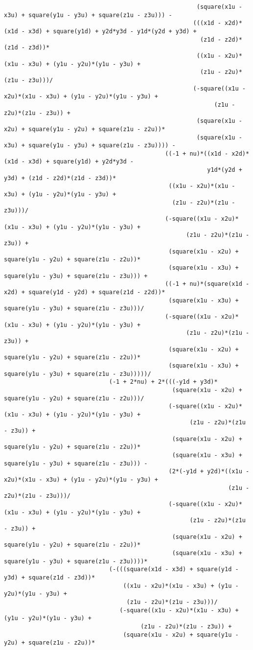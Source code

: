\begin{lstlisting}
													   (square(x1u - x3u) + square(y1u - y3u) + square(z1u - z3u))) - 
													  (((x1d - x2d)*(x1d - x3d) + square(y1d) + y2d*y3d - y1d*(y2d + y3d) + 
														(z1d - z2d)*(z1d - z3d))*
													   ((x1u - x2u)*(x1u - x3u) + (y1u - y2u)*(y1u - y3u) + 
														(z1u - z2u)*(z1u - z3u)))/
													  (-square((x1u - x2u)*(x1u - x3u) + (y1u - y2u)*(y1u - y3u) + 
															(z1u - z2u)*(z1u - z3u)) + 
													   (square(x1u - x2u) + square(y1u - y2u) + square(z1u - z2u))*
													   (square(x1u - x3u) + square(y1u - y3u) + square(z1u - z3u)))) - 
											  ((-1 + nu)*((x1d - x2d)*(x1d - x3d) + square(y1d) + y2d*y3d - 
														  y1d*(y2d + y3d) + (z1d - z2d)*(z1d - z3d))*
											   ((x1u - x2u)*(x1u - x3u) + (y1u - y2u)*(y1u - y3u) + 
												(z1u - z2u)*(z1u - z3u)))/
											  (-square((x1u - x2u)*(x1u - x3u) + (y1u - y2u)*(y1u - y3u) + 
													(z1u - z2u)*(z1u - z3u)) + 
											   (square(x1u - x2u) + square(y1u - y2u) + square(z1u - z2u))*
											   (square(x1u - x3u) + square(y1u - y3u) + square(z1u - z3u))) + 
											  ((-1 + nu)*(square(x1d - x2d) + square(y1d - y2d) + square(z1d - z2d))*
											   (square(x1u - x3u) + square(y1u - y3u) + square(z1u - z3u)))/
											  (-square((x1u - x2u)*(x1u - x3u) + (y1u - y2u)*(y1u - y3u) + 
													(z1u - z2u)*(z1u - z3u)) + 
											   (square(x1u - x2u) + square(y1u - y2u) + square(z1u - z2u))*
											   (square(x1u - x3u) + square(y1u - y3u) + square(z1u - z3u)))))/
							  (-1 + 2*nu) + 2*(((-y1d + y3d)*
												(square(x1u - x2u) + square(y1u - y2u) + square(z1u - z2u)))/
											   (-square((x1u - x2u)*(x1u - x3u) + (y1u - y2u)*(y1u - y3u) + 
													 (z1u - z2u)*(z1u - z3u)) + 
												(square(x1u - x2u) + square(y1u - y2u) + square(z1u - z2u))*
												(square(x1u - x3u) + square(y1u - y3u) + square(z1u - z3u))) - 
											   (2*(-y1d + y2d)*((x1u - x2u)*(x1u - x3u) + (y1u - y2u)*(y1u - y3u) + 
																(z1u - z2u)*(z1u - z3u)))/
											   (-square((x1u - x2u)*(x1u - x3u) + (y1u - y2u)*(y1u - y3u) + 
													 (z1u - z2u)*(z1u - z3u)) + 
												(square(x1u - x2u) + square(y1u - y2u) + square(z1u - z2u))*
												(square(x1u - x3u) + square(y1u - y3u) + square(z1u - z3u))))*
							  (-(((square(x1d - x3d) + square(y1d - y3d) + square(z1d - z3d))*
								  ((x1u - x2u)*(x1u - x3u) + (y1u - y2u)*(y1u - y3u) + 
								   (z1u - z2u)*(z1u - z3u)))/
								 (-square((x1u - x2u)*(x1u - x3u) + (y1u - y2u)*(y1u - y3u) + 
									   (z1u - z2u)*(z1u - z3u)) + 
								  (square(x1u - x2u) + square(y1u - y2u) + square(z1u - z2u))*

\end{lstlisting}
